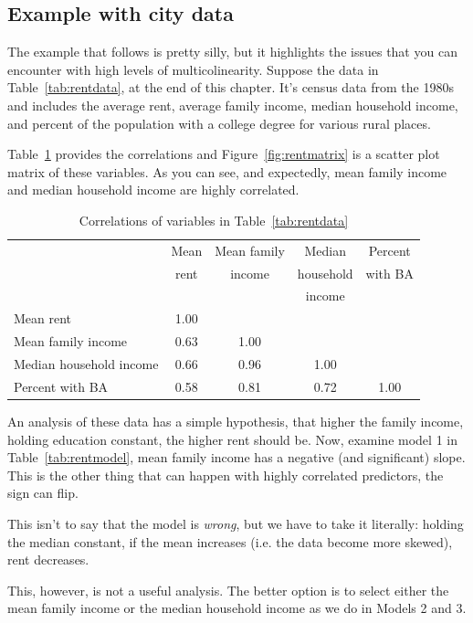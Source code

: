 \subsection{Example with city data}

The example that follows is pretty silly, but it highlights the issues that you can encounter with high levels of multicolinearity. Suppose the data in Table~\ref{tab:rentdata}, at the end of this chapter. It's census data from the 1980s and includes the average rent, average family income, median household income, and percent of the population with a college degree for various rural places.

Table~\ref{tab:rentcorr} provides the correlations and Figure~\ref{fig:rentmatrix} is a scatter plot matrix of these variables. As you can see, and expectedly, mean family income and median household income are highly correlated.

\begin{table}[htbp]\centering
 \caption{Correlations of variables in Table~\ref{tab:rentdata}
\label{tab:rentcorr}}
\begin{tabular}{lcccc}
\hline
& Mean & Mean family & Median & Percent \\
& rent & income & household & with BA \\
& & & income & \\
\hline
Mean rent & 1.00 \\
Mean family income & 0.63 & 1.00 \\
Median household income & 0.66 & 0.96 & 1.00 \\
Percent with BA & 0.58 & 0.81 & 0.72 & 1.00 \\
\hline
\end{tabular}
\end{table}

An analysis of these data has a simple hypothesis, that higher the family income, holding education constant, the higher rent should be. Now, examine model 1 in Table~\ref{tab:rentmodel}, mean family income has a negative (and significant) slope. This is the other thing that can happen with highly correlated predictors, the sign can flip.

This isn't to say that the model is {\it wrong}, but we have to take it literally: holding the median constant, if the mean increases (i.e. the data become more skewed), rent decreases.

This, however, is not a useful analysis. The better option is to select either the mean family income or the median household income as we do in Models 2 and 3.

